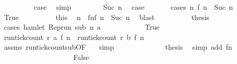 \begin{isabellebody}
\ \ \ \ \ \ \isamarkupfalse%
\ \isamarkupfalse%
\ {\isacharquery}case\ \isamarkupfalse%
\ simp\isanewline
\ \ \isamarkupfalse%
\isanewline
\ \ \ \ \isamarkupfalse%
\ {\isacharparenleft}Suc\ n{\isacharprime}{\isacharparenright}\ \isamarkupfalse%
\ {\isacharquery}case\ \isanewline
\ \ \ \ \isamarkupfalse%
\ {\isacharparenleft}cases\ {\isacartoucheopen}{\isasymexists}n\ f\ n\ {\isacharequal}\ Suc\ n{\isacharprime}{\isacartoucheclose}{\isacharparenright}\isanewline
\ \ \ \ \ \ \isamarkupfalse%
\ True\isanewline
\ \ \ \ \ \ \ \ \isamarkupfalse%
\ this\ \isamarkupfalse%
\ n\ \ fn{}{\isacharcolon}{\isacartoucheopen}f\ n\ {\isacharequal}\ Suc\ n{\isacharprime}{\isacartoucheclose}\ \isamarkupfalse%
\ blast\isanewline
\ \ \ \ \ \ \ \ \isamarkupfalse%
\ {\isacharquery}thesis\isanewline
\ \ \ \ \ \ \ \ \isamarkupfalse%
\ {\isacharparenleft}cases\ {\isacartoucheopen}hamlet\ {\isacharparenleft}{\isacharparenleft}Rep{\isacharunderscore}run\ sub{\isacharparenright}\ n\ a{\isacharparenright}{\isacartoucheclose}{\isacharparenright}\isanewline
\ \ \ \ \ \ \ \ \ \ \isamarkupfalse%
\ True\isanewline
\ \ \ \ \ \ \ \ \ \ \ \ \isamarkupfalse%
\ {\isachardoublequoteopen}run{\isacharunderscore}tick{\isacharunderscore}count\ r\ a\ {\isacharparenleft}f\ n\ {\isasymle}\ run{\isacharunderscore}tick{\isacharunderscore}count\ r\ b\ {\isacharparenleft}f\ n\isanewline
\ \ \ \ \ \ \ \ \ \ \ \ \ \ \isamarkupfalse%
\ assms{\isacharparenleft}{}{\isacharparenright}\ run{\isacharunderscore}tick{\isacharunderscore}count{\isacharunderscore}sub{\isacharbrackleft}OF\ {\isacharasterisk}{\isacharbrackright}\ \isamarkupfalse%
\ simp\isanewline
\ \ \ \ \ \ \ \ \ \ \ \ \isamarkupfalse%
\ {\isacharquery}thesis\ \isamarkupfalse%
\ {\isacharparenleft}simp\ add{\isacharcolon}\ fn{}{\isacharparenright}\isanewline
\ \ \ \ \ \ \ \ \isamarkupfalse%
\isanewline
\ \ \ \ \ \ \ \ \ \ \isamarkupfalse%
\ False\isanewline
\ \ \ \ \ \ \ \ \ \ \ \ \isamarkupfalse%

\end{isabellebody}
